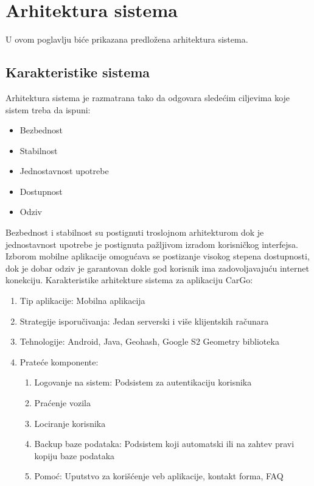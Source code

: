 \newpage

\section{\bfseries Arhitektura sistema}

U ovom poglavlju biće prikazana predložena arhitektura sistema.

\subsection{\bfseries Karakteristike sistema}

Arhitektura sistema je razmatrana tako da odgovara sledećim ciljevima koje sistem treba da ispuni:
\begin{itemize}
    \item Bezbednost
    \item Stabilnost
    \item Jednostavnost upotrebe
    \item Dostupnost
    \item Odziv
\end{itemize}
Bezbednost i stabilnost su postignuti troslojnom arhitekturom dok je jednostavnost upotrebe je postignuta pažljivom izradom korisničkog interfejsa. Izborom mobilne aplikacije omogućava se postizanje visokog stepena dostupnosti, dok je dobar odziv je garantovan dokle god korisnik ima zadovoljavajuću internet konekciju.
Karakteristike arhitekture sistema za aplikaciju CarGo:
\begin{enumerate}
    \item Tip aplikacije: Mobilna aplikacija
    \item Strategije isporučivanja: Jedan serverski i više klijentskih računara
    \item Tehnologije: Android, Java, Geohash, Google S2 Geometry biblioteka
    \item Prateće komponente:
    \begin{enumerate}
        \item Logovanje na sistem: Podsistem za autentikaciju korisnika
        \item Praćenje vozila
        \item Lociranje korisnika
        \item Backup baze podataka: Podsistem koji automatski ili na zahtev pravi kopiju baze podataka
        \item Pomoć: Uputstvo za korišćenje veb aplikacije, kontakt forma, FAQ
    \end{enumerate}
\end{enumerate}

